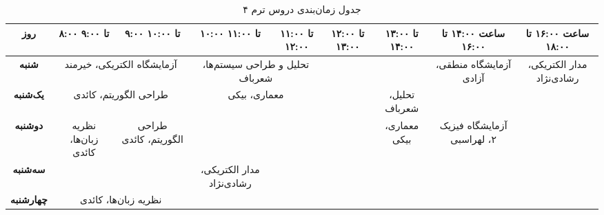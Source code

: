 \documentclass{article}
\begin{document}
	
 	\begin{sidewaystable}[h]
		\begin{center}	
 			\caption{جدول زمان‌بندی دروس ترم ۴}	
			\begin{tabular}{|c|c|c|c|c|c|c|c|c|c|c|}
				\hline
                 				روز &
			۸:۰۰ تا ۹:۰۰ & ۹:۰۰ تا ۱۰:۰۰ &
			۱۰:۰۰ تا ۱۱:۰۰ & ۱۱:۰۰ تا ۱۲:۰۰ &
			۱۲:۰۰ تا ۱۳:۰۰ & ۱۳:۰۰ تا ۱۴:۰۰ &
				\multicolumn{2}{|c|}{ساعت ۱۴:۰۰ تا ۱۶:۰۰} &
				\multicolumn{2}{|c|}{ساعت ۱۶:۰۰ تا ۱۸:۰۰} \\
				\hline
				\hline
				                \textbf{شنبه} &
				\multicolumn{2}{|c|}{آزمایشگاه الکتریکی، خیرمند} &
				\multicolumn{2}{|c|}{تحلیل و طراحی سیستم‌ها، شعرباف} &
				\multicolumn{2}{|c|}{} &
				\multicolumn{2}{|c|}{آزمایشگاه منطقی، آزادی} &
				\multicolumn{2}{|c|}{مدار الکتریکی، رشادی‌نژاد} \\
				\hline
				
								\textbf{یک‌شنبه} &
				\multicolumn{2}{|c|}{طراحی الگوریتم، کائدی} &
				\multicolumn{2}{|c|}{معماری، بیکی} &
				 & تحلیل، شعرباف &
				\multicolumn{2}{|c|}{} &
				\multicolumn{2}{|c|}{} \\
				\hline
				
								\textbf{دوشنبه} &
				نظریه زبان‌ها، کائدی & طراحی الگوریتم، کائدی &
				\multicolumn{2}{|c|}{} &
				& معماری، بیکی &
				\multicolumn{2}{|c|}{آزمایشگاه فیزیک ۲، لهراسبی} &
				\multicolumn{2}{|c|}{} \\
				\hline
								\textbf{سه‌شنبه} &
				\multicolumn{2}{|c|}{} &
                 مدار الکتریکی، رشادی‌نژاد& &
				\multicolumn{2}{|c|}{} &
				\multicolumn{2}{|c|}{} &
				\multicolumn{2}{|c|}{} \\
				\hline
								\textbf{چهارشنبه} &
				\multicolumn{2}{|c|}{نظریه زبان‌ها، کائدی} &
				\multicolumn{2}{|c|}{} &
				\multicolumn{2}{|c|}{} &
				\multicolumn{2}{|c|}{} &
				\multicolumn{2}{|c|}{} \\
				\hline
            \end{tabular}
		\end{center}
 	\end{sidewaystable}
\end{document}
